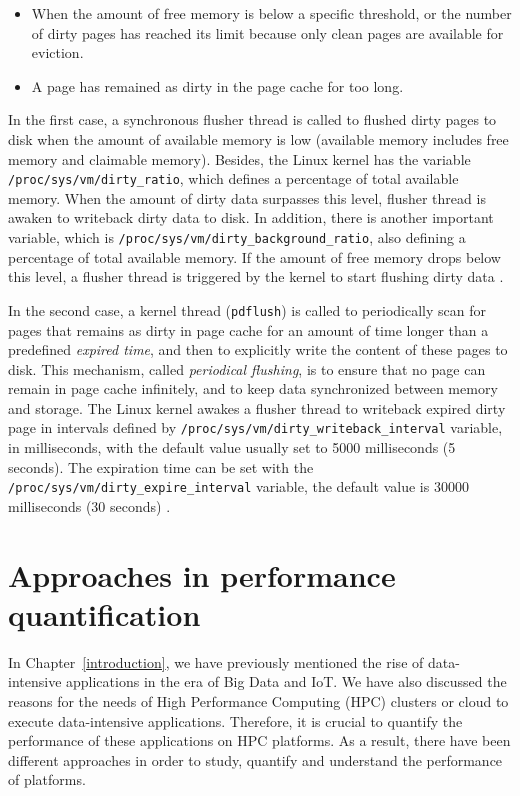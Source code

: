 \begin{itemize}
    \item When the amount of free memory is below a specific threshold, or the 
    number of dirty pages has reached its limit because only clean pages are 
    available for eviction.
    \item A page has remained as dirty in the page cache for too long. 
\end{itemize}

In the first case, a synchronous flusher thread is called to flushed dirty pages 
to disk when the amount of available memory is low (available memory 
includes free memory and claimable memory).
Besides, the Linux kernel has the variable \texttt{/proc/sys/vm/dirty\_ratio}, 
which defines a percentage of total available memory. 
When the amount of dirty data surpasses this level, flusher thread is awaken 
to writeback dirty data to disk.
In addition, there is another important variable, 
which is \texttt{/proc/sys/vm/dirty\_background\_ratio},
also defining a percentage of total available memory. 
If the amount of free memory drops below this level, a flusher thread is 
triggered by the kernel to start flushing dirty data \cite{linuxdev3rd2010}.

In the second case, a kernel thread (\texttt{pdflush}) is called to periodically 
scan for pages that remains as dirty in page cache for an amount of time 
longer than a predefined \textit{expired time}, and then to explicitly write 
the content of these pages to disk. 
This mechanism, called \textit{periodical flushing}, is to ensure that no page 
can remain in page cache infinitely, and to keep data synchronized between 
memory and storage.
The Linux kernel awakes a flusher thread to writeback expired dirty page in 
intervals defined by \texttt{/proc/sys/vm/dirty\_writeback\_interval} variable, 
in milliseconds, with the default value usually set to 5000 milliseconds (5 seconds). 
The expiration time can be set with the 
\texttt{/proc/sys/vm/dirty\_expire\_interval} variable, 
the default value is 30000 milliseconds (30 seconds) \cite{linuxdev3rd2010}.

\section{Approaches in performance quantification}

In Chapter~\ref{introduction}, we have previously mentioned the 
rise of data-intensive applications in the era of Big Data and IoT.
We have also discussed the reasons for the needs of High Performance 
Computing (HPC) clusters or cloud to execute data-intensive applications.
Therefore, it is crucial to quantify the performance of these applications 
on HPC platforms. As a result, there have been different approaches 
in order to study, quantify and understand the performance of platforms.

